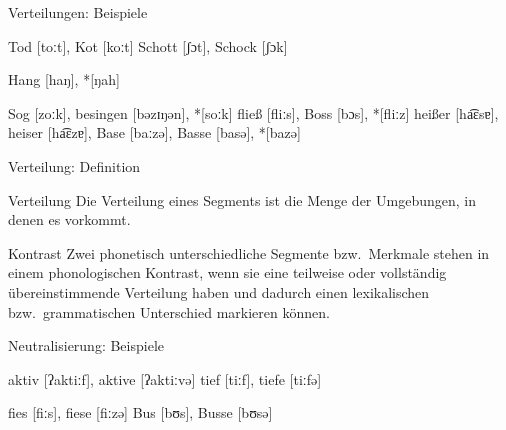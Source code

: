 \begin{frame}
  {Verteilungen: Beispiele}
  \pause
  \begin{exe}
    \ex
      \begin{xlist}
        \ex Tod [toːt], Kot [koːt]
        \pause
        \ex Schott [ʃɔt], Schock [ʃɔk]
      \end{xlist}
        \pause
    \ex Hang [haŋ], *[ŋah]
        \pause
    \ex
      \begin{xlist}
        \ex Sog [zoːk], besingen [bəzɪŋən], *[soːk]
        \pause
        \ex fließ [fliːs], Boss [bɔs], *[fliːz]
        \pause
        \ex heißer [ha͡ɛsɐ], heiser [ha͡ɛzɐ], Base [baːzə], Basse [basə], *[bazə]
      \end{xlist}
  \end{exe}
\end{frame}


\begin{frame}
  {Verteilung: Definition}
  \pause
  \Large
  \begin{block}{Verteilung}
    Die Verteilung eines Segments ist die Menge der Umgebungen, in denen es vorkommt.
  \end{block}
  \pause
  \Zeile
  \begin{block}{Kontrast}
    Zwei phonetisch unterschiedliche Segmente bzw.\ Merkmale stehen in einem phonologischen 
  Kontrast, wenn sie eine teilweise oder vollständig übereinstimmende Verteilung haben und dadurch einen lexikalischen bzw.\ grammatischen Unterschied markieren können.
  \end{block}
\end{frame}

\begin{frame}
  {Neutralisierung: Beispiele}
  \pause
  \begin{exe}
    \ex
    \begin{xlist}
      \pause
      \pause
    \end{xlist}
    \ex
    \begin{xlist}
      \pause
      \pause
    \end{xlist}
    \ex
    \begin{xlist}
      \pause
    \end{xlist}
    \ex
    \begin{xlist}
      \ex aktiv [ʔaktiːf], aktive [ʔaktiːvə]
      \ex tief [tiːf], tiefe [tiːfə]
    \end{xlist}
    \ex
    \begin{xlist}
      \ex fies [fiːs], fiese [fiːzə]
      \ex Bus [bʊs], Busse [bʊsə]
    \end{xlist}
  \end{exe}
\end{frame}

